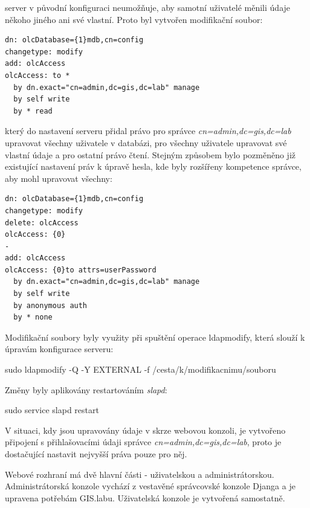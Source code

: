  server v původní konfiguraci neumožňuje, aby samotní uživatelé měnili údaje někoho jiného ani své vlastní. Proto byl vytvořen modifikační soubor:

\begin{verbatim}
dn: olcDatabase={1}mdb,cn=config
changetype: modify
add: olcAccess
olcAccess: to * 
  by dn.exact="cn=admin,dc=gis,dc=lab" manage  
  by self write  
  by * read
\end{verbatim}

který do nastavení serveru přidal právo pro správce \textit{cn=admin,dc=gis,dc=lab} upravovat všechny uživatele v databázi, pro všechny uživatele upravovat své vlastní údaje a pro ostatní právo čtení. Stejným způsobem bylo pozměněno již existující nastavení práv k úpravě hesla, kde byly rozšířeny kompetence správce, aby mohl upravovat všechny:

\begin{verbatim}
dn: olcDatabase={1}mdb,cn=config
changetype: modify
delete: olcAccess
olcAccess: {0}
-
add: olcAccess
olcAccess: {0}to attrs=userPassword
  by dn.exact="cn=admin,dc=gis,dc=lab" manage
  by self write
  by anonymous auth
  by * none
\end{verbatim}

Modifikační soubory byly využity při spuštění operace ldapmodify, která slouží k úpravám konfigurace  serveru:
\begin{center}
\textsf{sudo ldapmodify -Q -Y EXTERNAL -f /cesta/k/modifikacnimu/souboru}
\end{center}

Změny byly aplikovány restartováním \textit{slapd}:
\begin{center}
\textsf{sudo service slapd restart}
\end{center}

V situaci, kdy jsou upravovány údaje v  skrze webovou konzoli, je vytvořeno připojení s přihlašovacími údaji správce \textit{cn=admin,dc=gis,dc=lab}, proto je dostačující nastavit nejvyšší práva pouze pro něj.

Webové rozhraní má dvě hlavní části - uživatelskou a administrátorskou. Administrátorská konzole vychází z vestavěné správcovské konzole Djanga a je upravena potřebám GIS.labu. Uživatelská konzole je vytvořená samostatně. 

\newpage
